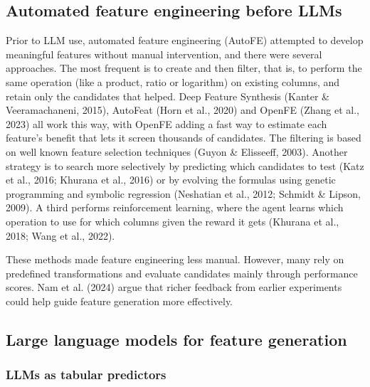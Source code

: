 \documentclass[11pt]{article}
\begin{document}
\subsection{Automated feature engineering before LLMs}

Prior to LLM use, automated feature engineering (AutoFE) attempted to develop meaningful features
without manual intervention, and there were several approaches. The most frequent is to create and
then filter, that is, to perform the same operation (like a product, ratio or logarithm) on existing
columns, and retain only the candidates that helped. Deep Feature Synthesis (Kanter \&
Veeramachaneni, 2015), AutoFeat (Horn et al., 2020) and OpenFE (Zhang et al., 2023) all work this
way, with OpenFE adding a fast way to estimate each feature's benefit that lets it screen thousands
of candidates. The filtering is based on well known feature selection techniques (Guyon \&
Elisseeff, 2003). Another strategy is to search more selectively by predicting which candidates to
test (Katz et al., 2016; Khurana et al., 2016) or by evolving the formulas using genetic programming
and symbolic regression (Neshatian et al., 2012; Schmidt \& Lipson, 2009). A third performs
reinforcement learning, where the agent learns which operation to use for which columns given the
reward it gets (Khurana et al., 2018; Wang et al., 2022).

These methods made feature engineering less manual. However, many rely on predefined
transformations and evaluate candidates mainly through performance scores. Nam et al. (2024) argue
that richer feedback from earlier experiments could help guide feature generation more effectively.

\subsection{Large language models for feature generation}

\subsubsection{LLMs as tabular predictors}
\end{document}
